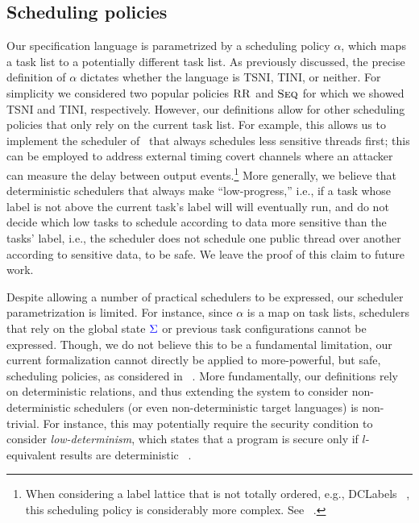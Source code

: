 \documentclass{sigplanconf}
\newcommand{\Varid}[1]{\mathit{#1}}
\newcommand{\Red}[1]{{\color{red} #1}}
\newcommand{\tocite}[1]{\Red{\cite{#1}}}
\begin{document}
\subsection{Scheduling policies}
Our specification language is parametrized by a scheduling policy
\ensuremath{\alpha}, which maps a task list to a potentially different task list.
%
As previously discussed, the precise definition of \ensuremath{\alpha}
dictates whether the language is TSNI, TINI, or neither.
%
For simplicity we considered two popular policies \ensuremath{\textsc{RR}} and
\ensuremath{\textsc{Seq}} for which we showed TSNI and TINI, respectively.
%
However, our definitions allow for other scheduling policies that only
rely on the current task list.
%
For example, this allows us to implement the scheduler of~\tocite{}
that always schedules less sensitive threads first; this can be
employed to address external timing covert channels where an attacker
can measure the delay between output events.\footnote{
  When considering a label lattice that is not totally ordered, e.g.,
  DCLabels~\tocite{}, this scheduling policy is considerably more
  complex. See~\tocite{}.
}
%
More generally, we believe that deterministic schedulers that always
make ``low-progress,'' i.e., if a task whose label is not above the
current task's label will will eventually run, and do not decide which
low tasks to schedule according to data more sensitive than the tasks'
label, i.e., the scheduler does not schedule one public thread over
another according to sensitive data, to be safe.
%
We leave the proof of this claim to future work.
%

Despite allowing a number of practical schedulers to be expressed, our
scheduler parametrization is limited.
%
For instance, since \ensuremath{\alpha} is a map on task lists, schedulers that
rely on the global state \ensuremath{\ifc{\Sigma}} or previous task configurations cannot
be expressed.
%
Though, we do not believe this to be a fundamental limitation, our
current formalization cannot directly be applied to more-powerful, but
safe, scheduling policies, as considered in~\tocite{}.
%
More fundamentally, our definitions rely on deterministic relations,
and thus extending the system to consider non-deterministic schedulers
(or even non-deterministic target languages) is non-trivial.
%
For instance, this may potentially require the security condition to
consider \emph{low-determinism}, which states that a program is secure
only if \ensuremath{\Varid{l}}-equivalent results are deterministic~\tocite{}. %
\end{document}
